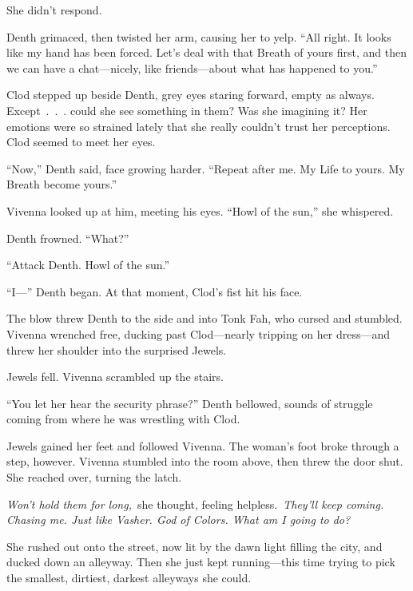 She didn’t respond.

Denth grimaced, then twisted her arm, causing her to yelp. “All right. It looks like my hand has been forced. Let’s deal with that Breath of yours first, and then we can have a chat—nicely, like friends—about what has happened to you.”

Clod stepped up beside Denth, grey eyes staring forward, empty as always. Except~.~.~. could she see something in them? Was she imagining it? Her emotions were so strained lately that she really couldn’t trust her perceptions. Clod seemed to meet her eyes.

“Now,” Denth said, face growing harder. “Repeat after me. My Life to yours. My Breath become yours.”

Vivenna looked up at him, meeting his eyes. “Howl of the sun,” she whispered.

Denth frowned. “What?”

“Attack Denth. Howl of the sun.”

“I—” Denth began. At that moment, Clod’s fist hit his face.

The blow threw Denth to the side and into Tonk Fah, who cursed and stumbled. Vivenna wrenched free, ducking past Clod—nearly tripping on her dress—and threw her shoulder into the surprised Jewels.

Jewels fell. Vivenna scrambled up the stairs.

“You let her hear the security phrase?” Denth bellowed, sounds of struggle coming from where he was wrestling with Clod.

Jewels gained her feet and followed Vivenna. The woman’s foot broke through a step, however. Vivenna stumbled into the room above, then threw the door shut. She reached over, turning the latch.

\textit{Won’t hold them for long,}~she thought, feeling helpless.~\textit{They’ll keep coming. Chasing me. Just like Vasher. God of Colors. What am I going to do?}

She rushed out onto the street, now lit by the dawn light filling the city, and ducked down an alleyway. Then she just kept running—this time trying to pick the smallest, dirtiest, darkest alleyways she could.

